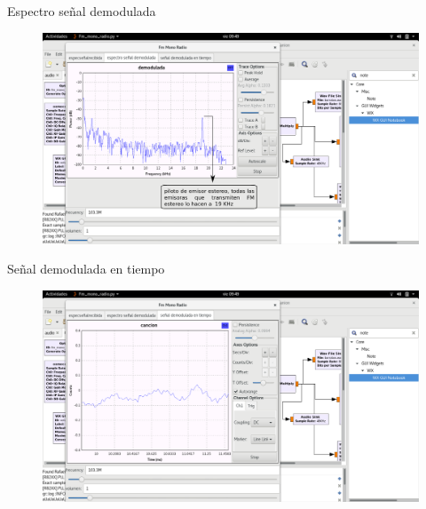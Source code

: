 \begin{frame}{Espectro señal demodulada}

\begin{figure}[H]
\centering
\vspace{-3mm}
\includegraphics[width=\textwidth]{parte3/lab8/pdf/lab8_8.pdf}
\end{figure}

\end{frame}

\begin{frame}{Señal demodulada en tiempo}

\begin{figure}[H]
\centering
\vspace{-3mm}
\includegraphics[width=\textwidth]{parte3/lab8/pdf/lab8_9.pdf}
\end{figure}

\end{frame}

